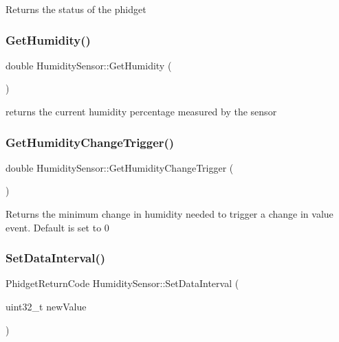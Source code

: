Returns the status of the phidget\mbox{\label{classHumiditySensor_aea4b9c30bd7fd630b98b80eea609030e}} 
\subsubsection{\texorpdfstring{Get\+Humidity()}{GetHumidity()}}
{\footnotesize\ttfamily double Humidity\+Sensor\+::\+Get\+Humidity (\begin{DoxyParamCaption}{ }\end{DoxyParamCaption})\hspace{0.3cm}{\ttfamily [inline]}}

returns the current humidity percentage measured by the sensor\mbox{\label{classHumiditySensor_a9bf5c13ab0c29b42fe7bc2fc0edde7ee}} 
\subsubsection{\texorpdfstring{Get\+Humidity\+Change\+Trigger()}{GetHumidityChangeTrigger()}}
{\footnotesize\ttfamily double Humidity\+Sensor\+::\+Get\+Humidity\+Change\+Trigger (\begin{DoxyParamCaption}{ }\end{DoxyParamCaption})\hspace{0.3cm}{\ttfamily [inline]}}

Returns the minimum change in humidity needed to trigger a change in value event. Default is set to 0\mbox{\label{classHumiditySensor_a7e8cd7d20eb2c942ca6fc7c22abd6fb8}} 
\subsubsection{\texorpdfstring{Set\+Data\+Interval()}{SetDataInterval()}}
{\footnotesize\ttfamily Phidget\+Return\+Code Humidity\+Sensor\+::\+Set\+Data\+Interval (\begin{DoxyParamCaption}\item[{uint32\+\_\+t}]{new\+Value }\end{DoxyParamCaption})\hspace{0.3cm}{\ttfamily [inline]}}


